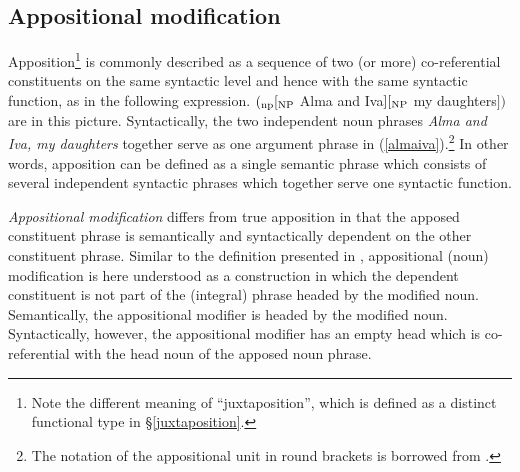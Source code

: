 \subsection{Appositional modification} \label{apposition}
Apposition\footnote{Note the different meaning of “juxtaposition”, which is defined as a distinct functional type in \S\ref{juxtaposition}.} is commonly described as a sequence of two (or more) co-referential constituents on the same syntactic level and hence with the same syntactic function, as in the following expression.
\ea
$(_{\rm np} [_{\rm NP}$ Alma and Iva$] [_{\rm NP}$ my daughters$] )$ are in this picture. \label{almaiva}
\z
Syntactically, the two independent noun phrases \textit{Alma and Iva, my daughters} together serve as one argument phrase in (\ref{almaiva}).\footnote{The notation of the appositional unit in round brackets is borrowed from \textcite[21]{rijkhoff2002}.} In other words, apposition can be defined as a single semantic phrase which consists of several independent syntactic phrases which together serve one syntactic function.

\emph{Appositional modification} differs from true apposition in that the apposed constituent phrase is semantically and syntactically dependent on the other constituent phrase. Similar to the definition presented in \textcite[22]{rijkhoff2002}, appositional (noun) modification is here understood as a construction in which the dependent constituent is not part of the (integral) phrase headed by the modified noun. Semantically, the appositional modifier is headed by the modified noun. Syntactically, however, the appositional modifier has an empty head which is co-referential with the head noun of the apposed noun phrase.

